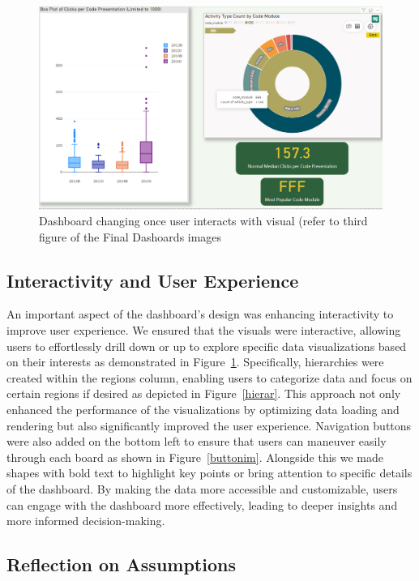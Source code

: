 \begin{figure}[h]
    \centering
    \includegraphics[width=\linewidth]{photo/changing.png}
    \caption{Dashboard changing once user interacts with visual (refer to third figure of the Final Dashoards images}
    \label{changin}
\end{figure}


\subsection*{Interactivity and User Experience}

An important aspect of the dashboard's design was enhancing interactivity to improve user experience. We ensured that the visuals were interactive, allowing users to effortlessly drill down or up to explore specific data visualizations based on their interests as demonstrated in Figure~\ref{changin}. Specifically, hierarchies were created within the regions column, enabling users to categorize data and focus on certain regions if desired as depicted in Figure~\ref{hierar}. This approach not only enhanced the performance of the visualizations by optimizing data loading and rendering but also significantly improved the user experience. Navigation buttons were also added on the bottom left to ensure that users can maneuver easily through each board as shown in Figure~\ref{buttonim}. Alongside this we made shapes with bold text to highlight key points or bring attention to specific details of the dashboard. By making the data more accessible and customizable, users can engage with the dashboard more effectively, leading to deeper insights and more informed decision-making.

\subsection*{Reflection on Assumptions}

